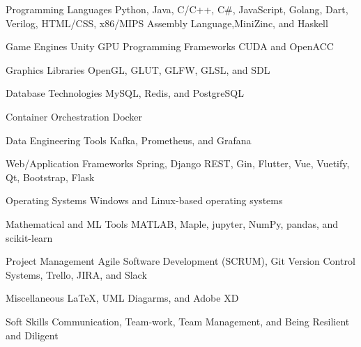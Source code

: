 

\begin{cvskills}

  \cvskill
    {Programming Languages} %
    {Python, Java, C/C++, C\#, JavaScript, Golang, Dart, Verilog, HTML/CSS, x86/MIPS Assembly Language,\newline MiniZinc, and Haskell} %

  \cvskill
    {Game Engines} %
    {Unity} %
  \cvskill
    {GPU Programming Frameworks} %
    {CUDA and OpenACC} %
    
  \cvskill
    {Graphics Libraries} %
    {OpenGL, GLUT, GLFW, GLSL, and SDL} %

  \cvskill
    {Database Technologies} %
    {MySQL, Redis, and PostgreSQL} %
    
  \cvskill
    {Container Orchestration} %
    {Docker} %

  \cvskill
    {Data Engineering Tools} %
    {Kafka, Prometheus, and Grafana} %

  \cvskill
    {Web/Application Frameworks} %
    {Spring, Django REST, Gin, Flutter, Vue, Vuetify, Qt, Bootstrap, Flask} %

  \cvskill
    {Operating Systems} %
    {Windows and Linux-based operating systems} %

  \cvskill
    {Mathematical and ML Tools} %
    {MATLAB, Maple, jupyter, NumPy, pandas, and scikit-learn} %

  \cvskill
    {Project Management} %
    {Agile Software Development (SCRUM), Git Version Control Systems, Trello, JIRA, and Slack} %

  \cvskill
    {Miscellaneous} %
    {\LaTeX \space, UML Diagarms, and Adobe XD} %

  \cvskill
    {Soft Skills} %
    {Communication, Team-work, Team Management, and Being Resilient and Diligent} %

\end{cvskills}
